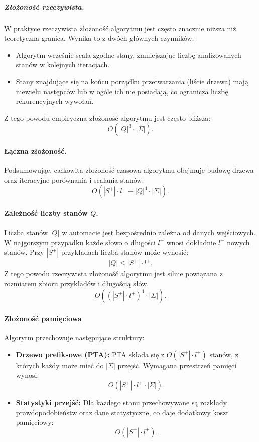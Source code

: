 \subparagraph*{Złożoność rzeczywista.}  
W praktyce rzeczywista złożoność algorytmu jest często znacznie niższa niż teoretyczna granica. Wynika to z dwóch głównych czynników:  
\begin{itemize}  
    \item Algorytm wcześnie scala zgodne stany, zmniejszając liczbę analizowanych stanów w kolejnych iteracjach.  
    \item Stany znajdujące się na końcu porządku przetwarzania (liście drzewa) mają niewielu następców lub w ogóle ich nie posiadają, co ogranicza liczbę rekurencyjnych wywołań.  
\end{itemize}  

Z tego powodu empiryczna złożoność algorytmu jest często bliższa:  
\[
O(|Q|^3 \cdot |\Sigma|).
\]  

\paragraph*{Łączna złożoność.}  
Podsumowując, całkowita złożoność czasowa algorytmu obejmuje budowę drzewa oraz iteracyjne porównania i scalania stanów:  
\[
O(|S^+| \cdot l^+ + |Q|^4 \cdot |\Sigma|).
\]

\paragraph*{Zależność liczby stanów \( Q \).}  
Liczba stanów \( |Q| \) w automacie jest bezpośrednio zależna od danych wejściowych. W najgorszym przypadku każde słowo o długości \( l^+ \) wnosi dokładnie \( l^+ \) nowych stanów. Przy \( |S^+| \) przykładach liczba stanów może wynosić:  
\[
|Q| \leq |S^+| \cdot l^+.
\]  
Z tego powodu rzeczywista złożoność algorytmu jest silnie powiązana z rozmiarem zbioru przykładów i długością słów.   
\[
O((|S^+| \cdot l^+)^4 \cdot |\Sigma|).
\]


\paragraph*{Złożoność pamięciowa}  
Algorytm przechowuje następujące struktury:  
\begin{itemize}  
    \item \textbf{Drzewo prefiksowe (PTA):}  
    PTA składa się z \( O(|S^+| \cdot l^+) \) stanów, z których każdy może mieć do \( |\Sigma| \) przejść. Wymagana przestrzeń pamięci wynosi:  
    \[
    O(|S^+| \cdot l^+ \cdot |\Sigma|).
    \]  

    \item \textbf{Statystyki przejść:}  
    Dla każdego stanu przechowywane są rozkłady prawdopodobieństw oraz dane statystyczne, co daje dodatkowy koszt pamięciowy:  
    \[
    O(|S^+| \cdot l^+).
    \]  
\end{itemize}  

